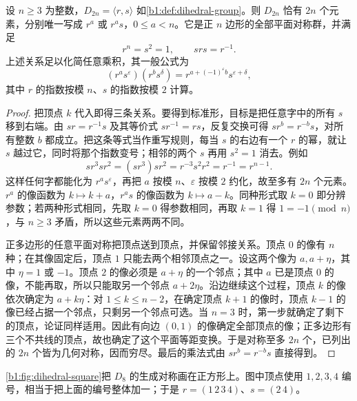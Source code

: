 \begin{proposition}\label{b1:prop:dihedral-normal-form}
	设 \(n\geq3\) 为整数，\(D_{2n}=\langle r,s\rangle\) 如\cref{b1:def:dihedral-group}。则 \(D_{2n}\) 恰有 \(2n\) 个元素，分别唯一写成 \(r^a\) 或 \(r^as\)，\(0\leq a<n\)。它是正 \(n\) 边形的全部平面对称群，并满足
	\[
		r^n=s^2=1,\qquad srs=r^{-1}.
	\]
	上述关系足以化简任意乘积，其一般公式为
	\begin{equation}\label{b1:eq:dihedral-multiplication}
		(r^as^\varepsilon)(r^bs^\delta) =r^{a+(-1)^\varepsilon b}s^{\varepsilon+\delta},
	\end{equation}
	其中 \(r\) 的指数按模 \(n\)、\(s\) 的指数按模 \(2\) 计算。
\end{proposition}
\begin{proof}
	把顶点 \(k\) 代入即得三条关系。要得到标准形，目标是把任意字中的所有 \(s\) 移到右端。由 \(sr=r^{-1}s\) 及其等价式 \(sr^{-1}=rs\)，反复交换可得 \(sr^b=r^{-b}s\)，对所有整数 \(b\) 都成立。把这条等式当作重写规则，每当 \(s\) 的右边有一个 \(r\) 的幂，就让 \(s\) 越过它，同时将那个指数变号；相邻的两个 \(s\) 再用 \(s^2=1\) 消去。例如
	\[
		sr^3sr^2=(sr^3)sr^2=r^{-3}s^2r^2=r^{-1}=r^{n-1}.
	\]
	这样任何字都能化为 \(r^as^\varepsilon\)，再把 \(a\) 按模 \(n\)、\(\varepsilon\) 按模 \(2\) 约化，故至多有 \(2n\) 个元素。\(r^a\) 的像函数为 \(k\mapsto k+a\)，\(r^as\) 的像函数为 \(k\mapsto a-k\)。同种形式取 \(k=0\) 即分辨参数；若两种形式相同，先取 \(k=0\) 得参数相同，再取 \(k=1\) 得 \(1=-1\pmod n\)，与 \(n\geq3\) 矛盾，所以这些元素两两不同。

	正多边形的任意平面对称把顶点送到顶点，并保留邻接关系。顶点 \(0\) 的像有 \(n\) 种；在其像固定后，顶点 \(1\) 只能去两个相邻顶点之一。设这两个像为 \(a,a+\eta\)，其中 \(\eta=1\) 或 \(-1\)。顶点 \(2\) 的像必须是 \(a+\eta\) 的一个邻点；其中 \(a\) 已是顶点 \(0\) 的像，不能再取，所以只能取另一个邻点 \(a+2\eta\)。沿边继续这个过程，顶点 \(k\) 的像依次确定为 \(a+k\eta\)：对 \(1\leq k\leq n-2\)，在确定顶点 \(k+1\) 的像时，顶点 \(k-1\) 的像已经占据一个邻点，只剩另一个邻点可选。当 \(n=3\) 时，第一步就确定了剩下的顶点，论证同样适用。因此有向边 \((0,1)\) 的像确定全部顶点的像；正多边形有三个不共线的顶点，故也确定了这个平面等距变换。于是对称至多 \(2n\) 个，已列出的 \(2n\) 个皆为几何对称，因而穷尽。最后的乘法式由 \(sr^b=r^{-b}s\) 直接得到。
\end{proof}

\cref{b1:fig:dihedral-square}把 \(D_8\) 的生成对称画在正方形上。图中顶点使用 \(1,2,3,4\) 编号，相当于把上面的编号整体加一；于是 \(r=(1\,2\,3\,4)\)、\(s=(2\,4)\)。


